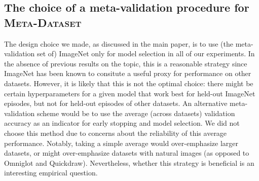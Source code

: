 \documentclass{article} \usepackage{iclr2020_conference,times}
\newcommand{\benchmark}{\textsc{Meta-Dataset}\xspace}
\begin{document}
\begin{table*}[t]
\end{table*}
 

\subsection{The choice of a meta-validation procedure for \benchmark}

The design choice we made, as discussed in the main paper, is to use (the meta-validation set of) ImageNet only for model selection in all of our experiments. In the absence of previous results on the topic, this is a reasonable strategy since ImageNet has been known to consitute a useful proxy for performance on other datasets. However, it is likely that this is not the optimal choice: there might be certain hyperparameters for a given model that work best for held-out ImageNet episodes, but not for held-out episodes of other datasets. An alternative meta-validation scheme would be to use the average (across datasets) validation accuracy as an indicator for early stopping and model selection. We did not choose this method due to concerns about the reliability of this average performance. Notably, taking a simple average would over-emphasize larger datasets, or might over-emphasize datasets with natural images (as opposed to Omniglot and Quickdraw). Nevertheless, whether this strategy is beneficial is an interesting empirical question.
\end{document}
